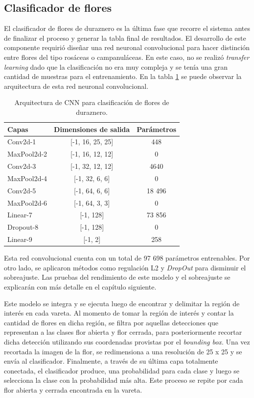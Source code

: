 \subsection{Clasificador de flores}

El clasificador de flores de duraznero es la última fase que recorre el sistema antes de finalizar el proceso y generar la tabla final de resultados. El desarrollo de este componente requirió diseñar una red neuronal convolucional para hacer distinción entre flores del tipo rosáceas o campanuláceas. En este caso, no se realizó \textit{transfer learning} dado que la clasificación no era muy compleja y se tenía una gran cantidad de muestras para el entrenamiento. En la tabla \ref{tab:FlowerCNN} se puede observar la arquitectura de esta red neuronal convolucional.

\begin{table}[h]
	\centering
	\caption{Arquitectura de CNN para clasificación de flores de duraznero.}
	\begin{tabular}{l c c}    
		\toprule
		\textbf{Capas}     & \textbf{Dimensiones de salida} & \textbf{Parámetros} \\
		\midrule
		Conv2d-1          & [-1, 16, 25, 25] &  448\\
		MaxPool2d-2       & [-1, 16, 12, 12] & 0\\
		Conv2d-3          & [-1, 32, 12, 12] & 4640 \\
		MaxPool2d-4       & [-1, 32, 6, 6]   & 0 \\
		Conv2d-5          & [-1, 64, 6, 6]   & 18 496 \\
		MaxPool2d-6       & [-1, 64, 3, 3]   & 0 \\	
		Linear-7          & [-1, 128]        & 73 856 \\
		Dropout-8         & [-1, 128]        & 0 \\
		Linear-9          & [-1, 2]          & 258 \\	
		\bottomrule
		\hline
	\end{tabular}
	\label{tab:FlowerCNN}
\end{table}  

Esta red convolucional cuenta con un total de 97 698 parámetros entrenables. Por otro lado, se aplicaron métodos como regulación L2 \cite{WEBSITE:10} y \textit{DropOut} \cite{ARTICLE:21} para disminuir el sobreajuste. Las pruebas del rendimiento de este modelo y el sobreajuste se explicarán con más detalle en el capítulo siguiente.

Este modelo se integra y se ejecuta luego de encontrar y delimitar la región de interés en cada vareta. Al momento de tomar la región de interés y contar la cantidad de flores en dicha región, se filtra por aquellas detecciones que representan a las clases flor abierta y flor cerrada, para posteriormente recortar dicha detección utilizando sus coordenadas provistas por el \textit{bounding box}. Una vez recortada la imagen de la flor, se redimensiona a una resolución de 25 x 25 y se envía al clasificador. Finalmente, a través de su última capa totalmente conectada, el clasificador produce, una probabilidad para cada clase y luego se selecciona la clase con la probabilidad más alta. Este proceso se repite por cada flor abierta y cerrada encontrada en la vareta. 


